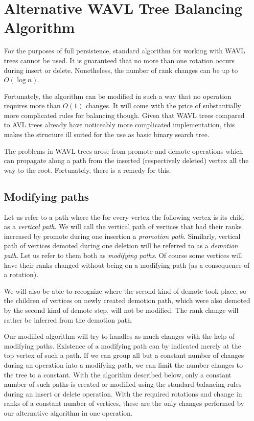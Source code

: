 \section{Alternative WAVL Tree Balancing Algorithm}

For the purposes of full persistence, standard algorithm for working with WAVL trees cannot be used. It is guaranteed that no more than one rotation occurs during insert or delete. Nonetheless, the number of rank changes can be up to $O(\log n)$. 

Fortunately, the algorithm can be modified in such a way that no operation requires more than $O(1)$ changes. It will come with the price of substantially more complicated rules for balancing though. Given that WAVL trees compared to AVL trees already have noticeably more complicated implementation, this makes the structure ill suited for the use as basic binary search tree. 

The problems in WAVL trees arose from promote and demote operations which can propagate along a path from the inserted (respectively deleted) vertex all the way to the root. Fortunately, there is a remedy for this. 

\subsection{Modifying paths}

Let us refer to a path where the for every vertex the following vertex is its child as a {\em vertical path}.
We will call the vertical path of vertices that had their ranks increased by promote during one insertion a {\em promotion path}. 
Similarly, vertical path of vertices demoted during one deletion will be referred to as a {\em demotion path}.
Let us refer to them both as {\em modifying paths}.
Of course some vertices will have their ranks changed without being on a modifying path (as a consequence of a rotation).

We will also be able to recognize where the second kind of demote took place, so the children of vertices on newly created demotion path, which were also demoted by the second kind of demote step, will not be modified. The rank change will rather be inferred from the demotion path. 

Our modified algorithm will try to handles as much changes with the help of modifying paths. Existence of a modifying path can by indicated merely at the top vertex of such a path. If we can group all but a constant number of changes during an operation into a modifying path, we can limit the number changes to the tree to a constant. With the algorithm described below, only a constant number of such paths is created or modified using the standard balancing rules during an insert or delete operation. With the required rotations and change in ranks of a constant number of vertices, these are the only changes performed by our alternative algorithm in one operation.

